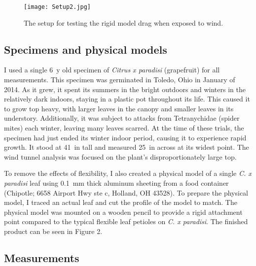 \documentclass[]{article}
\begin{document}
\begin{figure}
\begin{center}
\texttt{[image: Setup2.jpg]}
\end{center}
\caption{The setup for testing the rigid model drag when exposed to wind.}
\label{fig:methods3}
\end{figure}




\subsection{Specimens and physical models}
	I used a single \SI{6}{y} old specimen of \emph{Citrus x paradisi} (grapefruit) for all measurements. This specimen was germinated in Toledo, Ohio in January of 2014. As it grew, it spent its summers in the bright outdoors and winters in the relatively dark indoors, staying in a plastic pot throughout its life. This caused it to grow top heavy, with larger leaves in the canopy and smaller leaves in its understory. Additionally, it was subject to attacks from Tetranychidae (spider mites) each winter, leaving many leaves scarred. At the time of these trials, the specimen had just ended its winter indoor period, causing it to experience rapid growth. It stood at \SI{41}{in} tall and measured \SI{25}{in} across at its widest point. The wind tunnel analysis was focused on the plant's disproportionately large top.

	To remove the effects of flexibility, I also created a physical model of a single \emph{C. x paradisi} leaf using \SI{0.1}{mm} thick aluminum sheeting from a food container (Chipotle; 6658 Airport Hwy ste c, Holland, OH 43528). To prepare the physical model, I traced an actual leaf and cut the profile of the model to match. The physical model was mounted on a wooden pencil to provide a rigid attachment point compared to the typical flexible leaf petioles on \emph{C. x paradisi}. The finished product can be seen in Figure 2.

\subsection{Measurements}
\end{document}
